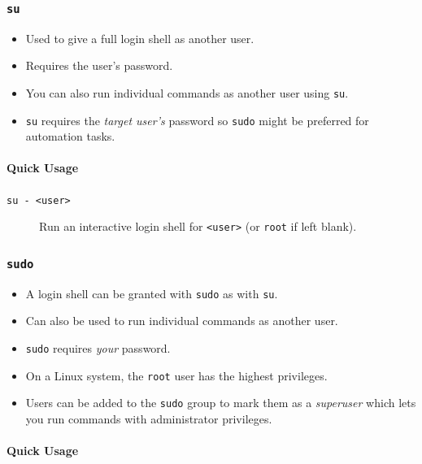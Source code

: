\documentclass{article}
\newcommand{\code}[1]{\texttt{#1}}
\begin{document}
\subsubsection{\code{su}}

\begin{itemize}
    \item Used to give a full login shell as another user.
    \item Requires the user's password.
    \item You can also run individual commands as another user using \code{su}.
    \item \code{su} requires the \emph{target user's} password so \code{sudo} might be preferred for automation tasks.
\end{itemize}

\paragraph{Quick Usage}

\begin{description}
    \item[\code{su - <user>}] Run an interactive login shell for \code{<user>} (or \code{root} if left blank).
\end{description}

\subsubsection{\code{sudo}}

\begin{itemize}
    \item A login shell can be granted with \code{sudo} as with \code{su}.
    \item Can also be used to run individual commands as another user.
    \item \code{sudo} requires \emph{your} password.
    \item On a Linux system, the \code{root} user has the highest privileges.
    \item Users can be added to the \code{sudo} group to mark them as a \emph{superuser} which lets you run commands with administrator privileges.
\end{itemize}

\paragraph{Quick Usage}
\end{document}
